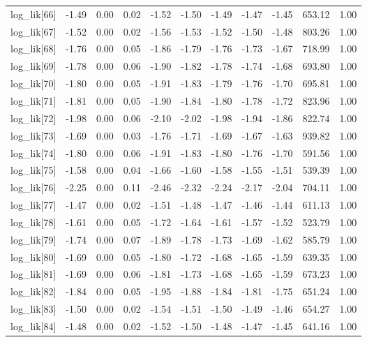 \begin{table}[ht]
\begin{tabular}{rrrrrrrrrrr}
  log\_lik[66] & -1.49 & 0.00 & 0.02 & -1.52 & -1.50 & -1.49 & -1.47 & -1.45 & 653.12 & 1.00 \\ 
  log\_lik[67] & -1.52 & 0.00 & 0.02 & -1.56 & -1.53 & -1.52 & -1.50 & -1.48 & 803.26 & 1.00 \\ 
  log\_lik[68] & -1.76 & 0.00 & 0.05 & -1.86 & -1.79 & -1.76 & -1.73 & -1.67 & 718.99 & 1.00 \\ 
  log\_lik[69] & -1.78 & 0.00 & 0.06 & -1.90 & -1.82 & -1.78 & -1.74 & -1.68 & 693.80 & 1.00 \\ 
  log\_lik[70] & -1.80 & 0.00 & 0.05 & -1.91 & -1.83 & -1.79 & -1.76 & -1.70 & 695.81 & 1.00 \\ 
  log\_lik[71] & -1.81 & 0.00 & 0.05 & -1.90 & -1.84 & -1.80 & -1.78 & -1.72 & 823.96 & 1.00 \\ 
  log\_lik[72] & -1.98 & 0.00 & 0.06 & -2.10 & -2.02 & -1.98 & -1.94 & -1.86 & 822.74 & 1.00 \\ 
  log\_lik[73] & -1.69 & 0.00 & 0.03 & -1.76 & -1.71 & -1.69 & -1.67 & -1.63 & 939.82 & 1.00 \\ 
  log\_lik[74] & -1.80 & 0.00 & 0.06 & -1.91 & -1.83 & -1.80 & -1.76 & -1.70 & 591.56 & 1.00 \\ 
  log\_lik[75] & -1.58 & 0.00 & 0.04 & -1.66 & -1.60 & -1.58 & -1.55 & -1.51 & 539.39 & 1.00 \\ 
  log\_lik[76] & -2.25 & 0.00 & 0.11 & -2.46 & -2.32 & -2.24 & -2.17 & -2.04 & 704.11 & 1.00 \\ 
  log\_lik[77] & -1.47 & 0.00 & 0.02 & -1.51 & -1.48 & -1.47 & -1.46 & -1.44 & 611.13 & 1.00 \\ 
  log\_lik[78] & -1.61 & 0.00 & 0.05 & -1.72 & -1.64 & -1.61 & -1.57 & -1.52 & 523.79 & 1.00 \\ 
  log\_lik[79] & -1.74 & 0.00 & 0.07 & -1.89 & -1.78 & -1.73 & -1.69 & -1.62 & 585.79 & 1.00 \\ 
  log\_lik[80] & -1.69 & 0.00 & 0.05 & -1.80 & -1.72 & -1.68 & -1.65 & -1.59 & 639.35 & 1.00 \\ 
  log\_lik[81] & -1.69 & 0.00 & 0.06 & -1.81 & -1.73 & -1.68 & -1.65 & -1.59 & 673.23 & 1.00 \\ 
  log\_lik[82] & -1.84 & 0.00 & 0.05 & -1.95 & -1.88 & -1.84 & -1.81 & -1.75 & 651.24 & 1.00 \\ 
  log\_lik[83] & -1.50 & 0.00 & 0.02 & -1.54 & -1.51 & -1.50 & -1.49 & -1.46 & 654.27 & 1.00 \\ 
  log\_lik[84] & -1.48 & 0.00 & 0.02 & -1.52 & -1.50 & -1.48 & -1.47 & -1.45 & 641.16 & 1.00 \\ 

\end{tabular}
\end{table}
